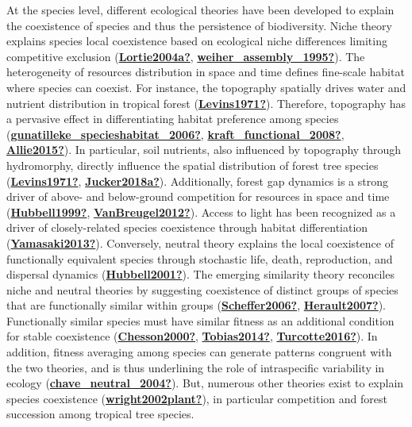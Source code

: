 \documentclass[12pt,twoside,a4paper, a]{article}
\begin{document}
At the species level, different ecological theories have been developed to explain the coexistence of species and thus the persistence of biodiversity.
Niche theory explains species local coexistence based on ecological niche differences limiting competitive exclusion (\protect\hyperlink{ref-Lortie2004a}{\textbf{Lortie2004a?}}, \protect\hyperlink{ref-weiher_assembly_1995}{\textbf{weiher\_assembly\_1995?}}).
The heterogeneity of resources distribution in space and time defines fine-scale habitat where species can coexist.
For instance, the topography spatially drives water and nutrient distribution in tropical forest (\protect\hyperlink{ref-Levins1971}{\textbf{Levins1971?}}).
Therefore, topography has a pervasive effect in differentiating habitat preference among species (\protect\hyperlink{ref-gunatilleke_specieshabitat_2006}{\textbf{gunatilleke\_specieshabitat\_2006?}}, \protect\hyperlink{ref-kraft_functional_2008}{\textbf{kraft\_functional\_2008?}}, \protect\hyperlink{ref-Allie2015}{\textbf{Allie2015?}}).
In particular, soil nutrients, also influenced by topography through hydromorphy, directly influence the spatial distribution of forest tree species (\protect\hyperlink{ref-Levins1971}{\textbf{Levins1971?}}, \protect\hyperlink{ref-Jucker2018a}{\textbf{Jucker2018a?}}).
Additionally, forest gap dynamics is a strong driver of above- and below-ground competition for resources in space and time (\protect\hyperlink{ref-Hubbell1999}{\textbf{Hubbell1999?}}, \protect\hyperlink{ref-VanBreugel2012}{\textbf{VanBreugel2012?}}).
Access to light has been recognized as a driver of closely-related species coexistence through habitat differentiation (\protect\hyperlink{ref-Yamasaki2013}{\textbf{Yamasaki2013?}}).
Conversely, neutral theory explains the local coexistence of functionally equivalent species through stochastic life, death, reproduction, and dispersal dynamics (\protect\hyperlink{ref-Hubbell2001}{\textbf{Hubbell2001?}}).
The emerging similarity theory reconciles niche and neutral theories by suggesting coexistence of distinct groups of species that are functionally similar within groups (\protect\hyperlink{ref-Scheffer2006}{\textbf{Scheffer2006?}}, \protect\hyperlink{ref-Herault2007}{\textbf{Herault2007?}}).
Functionally similar species must have similar fitness as an additional condition for stable coexistence (\protect\hyperlink{ref-Chesson2000}{\textbf{Chesson2000?}}, \protect\hyperlink{ref-Tobias2014}{\textbf{Tobias2014?}}, \protect\hyperlink{ref-Turcotte2016}{\textbf{Turcotte2016?}}).
In addition, fitness averaging among species can generate patterns congruent with the two theories,
and is thus underlining the role of intraspecific variability in ecology (\protect\hyperlink{ref-chave_neutral_2004}{\textbf{chave\_neutral\_2004?}}).
But, numerous other theories exist to explain species coexistence (\protect\hyperlink{ref-wright2002plant}{\textbf{wright2002plant?}}),
in particular competition and forest succession among tropical tree species.
\end{document}
